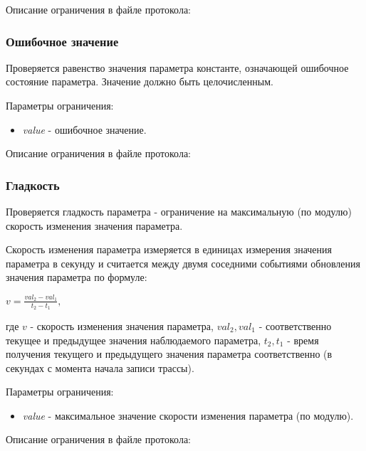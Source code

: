 Описание ограничения в файле протокола:




\subsubsection{Ошибочное значение}

Проверяется равенство значения параметра константе, означающей 
ошибочное состояние параметра. Значение должно быть целочисленным.

Параметры ограничения:
\begin{itemize}
 \item \textit{value} - ошибочное значение.
\end{itemize}

Описание ограничения в файле протокола:



\subsubsection{Гладкость}

Проверяется гладкость параметра - ограничение на максимальную (по модулю) 
скорость изменения значения параметра.

Скорость изменения параметра измеряется в единицах измерения значения параметра 
в секунду и считается между двумя соседними событиями обновления значения 
параметра по формуле:

$
v = \frac{val_2 - val_1}{t_2 - t_1},
$

где $v$ - скорость изменения значения параметра, $val_2, val_1$ - 
соответственно текущее и предыдущее значения наблюдаемого параметра, $t_2, t_1$ 
- время получения текущего и предыдущего значения параметра соответственно (в 
секундах с момента начала записи трассы).

Параметры ограничения:
\begin{itemize}
 \item \textit{value} - максимальное значение скорости изменения параметра (по 
модулю).
\end{itemize}

Описание ограничения в файле протокола:




